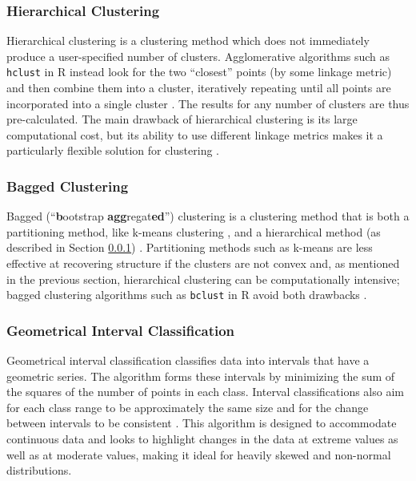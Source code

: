\documentclass[fleqn,usenatbib]{mnras}
\begin{document}
\subsubsection{Hierarchical Clustering}
\label{sssec: hierarchical}

Hierarchical clustering is a clustering method which does not immediately produce a user-specified number of clusters. Agglomerative algorithms such as \texttt{hclust} in R instead look for the two ``closest'' points (by some linkage metric) and then combine them into a cluster, iteratively repeating until all points are incorporated into a single cluster \citep{leisch1999bagged, mullner2013fastcluster}. The results for any number of clusters are thus pre-calculated. The main drawback of hierarchical clustering is its large computational cost, but its ability to use different linkage metrics makes it a particularly flexible solution for clustering \citep{leisch1999bagged}.

\subsubsection{Bagged Clustering}
\label{sssec: bagged}

Bagged (``\textbf{b}ootstrap \textbf{agg}regat\textbf{ed}'') clustering is a clustering method that is both a partitioning method, like k-means clustering \citep{macqueen1967some}, and a hierarchical method (as described in Section \ref{sssec: hierarchical}) \citep{leisch1999bagged}. Partitioning methods such as k-means are less effective at recovering structure if the clusters are not convex and, as mentioned in the previous section, hierarchical clustering can be computationally intensive; bagged clustering algorithms such as \texttt{bclust} in R avoid both drawbacks \citep{leisch1999bagged}.

\subsubsection{Geometrical Interval Classification}
Geometrical interval classification classifies data into intervals that have a geometric series. The algorithm forms these intervals by minimizing the sum of the squares of the number of points in each class. Interval classifications also aim for each class range to be approximately the same size and for the change between intervals to be consistent \citep{xu2002}. This algorithm is designed to accommodate continuous data and looks to highlight changes in the data at extreme values as well as at moderate values, making it ideal for heavily skewed and non-normal distributions. 
\end{document}
